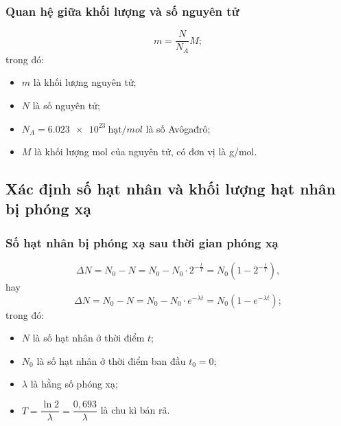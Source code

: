\subsubsection{Quan hệ giữa khối lượng và số nguyên tử}
\begin{equation}
	m=\dfrac{N}{N_A}M;
\end{equation}
trong đó:
\begin{itemize}
	\item $m$ là khối lượng nguyên tử;
	\item $N$ là số nguyên tử;
	\item $N_A=\SI{6,023e23}{\text{hạt}/mol}$ là số Avôgađrô;
	\item $M$ là khối lượng mol của nguyên tử, có đơn vị là g/mol.
\end{itemize}

\subsection{Xác định số hạt nhân và khối lượng hạt nhân bị phóng xạ}

\subsubsection{Số hạt nhân bị phóng xạ sau thời gian phóng xạ}
\begin{equation}
	\Delta N = N_0 - N = N_0 - N_0\cdot 2^{-\frac{t}{T}} = N_0\left( 1-2^{-\frac{t}{T}}\right),
\end{equation}
hay
\begin{equation}
	\Delta N = N_0 - N = N_0 - N_0\cdot e^{-\lambda t} = N_0\left( 1-e^{-\lambda t}\right);
\end{equation}
trong đó:
\begin{itemize}
	\item $N$ là số hạt nhân ở thời điểm $t$;
	\item $N_0$ là số hạt nhân ở thời điểm ban đầu $t_0=0$;
	\item $\lambda$ là hằng số phóng xạ;
	\item $T=\dfrac{\ln2}{\lambda}=\dfrac{0,693}{\lambda}$ là chu kì bán rã.
\end{itemize}
